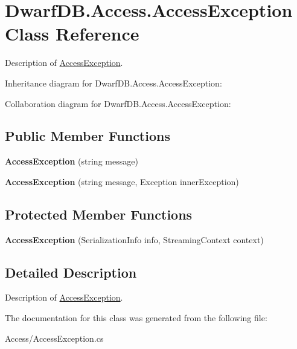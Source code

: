 \hypertarget{class_dwarf_d_b_1_1_access_1_1_access_exception}{\section{Dwarf\+D\+B.\+Access.\+Access\+Exception Class Reference}
\label{class_dwarf_d_b_1_1_access_1_1_access_exception}
}


Description of \hyperlink{class_dwarf_d_b_1_1_access_1_1_access_exception}{Access\+Exception}.  




Inheritance diagram for Dwarf\+D\+B.\+Access.\+Access\+Exception\+:


Collaboration diagram for Dwarf\+D\+B.\+Access.\+Access\+Exception\+:
\subsection*{Public Member Functions}
\begin{DoxyCompactItemize}
\item 
\hypertarget{class_dwarf_d_b_1_1_access_1_1_access_exception_a9db8bc09db860a4f1d297b5484b7b90c}{{\bfseries Access\+Exception} (string message)}\label{class_dwarf_d_b_1_1_access_1_1_access_exception_a9db8bc09db860a4f1d297b5484b7b90c}

\item 
\hypertarget{class_dwarf_d_b_1_1_access_1_1_access_exception_a5126c0bc7ebda87af3d6c933281249fc}{{\bfseries Access\+Exception} (string message, Exception inner\+Exception)}\label{class_dwarf_d_b_1_1_access_1_1_access_exception_a5126c0bc7ebda87af3d6c933281249fc}

\end{DoxyCompactItemize}
\subsection*{Protected Member Functions}
\begin{DoxyCompactItemize}
\item 
\hypertarget{class_dwarf_d_b_1_1_access_1_1_access_exception_a936cb568a4d45df162b542ba17b33e83}{{\bfseries Access\+Exception} (Serialization\+Info info, Streaming\+Context context)}\label{class_dwarf_d_b_1_1_access_1_1_access_exception_a936cb568a4d45df162b542ba17b33e83}

\end{DoxyCompactItemize}


\subsection{Detailed Description}
Description of \hyperlink{class_dwarf_d_b_1_1_access_1_1_access_exception}{Access\+Exception}. 



The documentation for this class was generated from the following file\+:\begin{DoxyCompactItemize}
\item 
Access/Access\+Exception.\+cs\end{DoxyCompactItemize}

